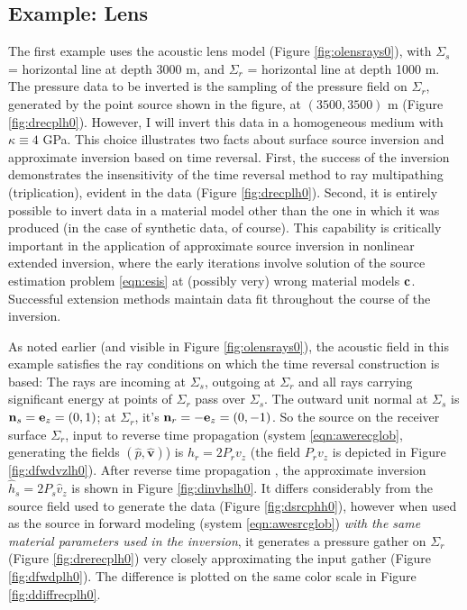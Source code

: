 \documentclass[12pt]{geophysics}
\newcommand{\bv}{\mathbf{v}}
\begin{document}
\subsection{Example: Lens}
The first example uses the acoustic lens model (Figure
\ref{fig:olensrays0}), with $\Sigma_s$ = horizontal line at depth 
3000 m, and $\Sigma_r$ = horizontal line at depth 1000 m. The pressure
data to be inverted is the sampling of the pressure field on
$\Sigma_r$, generated by the point source shown in the figure, at
$(3500, 3500)$ m (Figure \ref{fig:drecplh0}). However, I will invert
this data in a homogeneous medium with $\kappa \equiv 4$ GPa. This
choice illustrates two facts about surface source inversion and
approximate inversion based on time reversal. First, the success of the inversion demonstrates the
insensitivity of the time reversal method to ray multipathing
(triplication), evident in the data (Figure \ref{fig:drecplh0}).
Second, it is entirely possible to invert data in a material model
other than the one in which it was produced (in the case of synthetic
data, of course). This
capability is critically important in the application of 
approximate source inversion in nonlinear extended inversion, where the early iterations
involve solution of the source estimation problem \ref{eqn:esis} at
(possibly very) wrong material models ${\bf c}$. Successful extension
methods maintain data fit throughout the course of the inversion.

As noted earlier (and visible in Figure \ref{fig:olensrays0}), the acoustic field in this example satisfies the ray
conditions on which the time reversal construction is based: The rays
are incoming at $\Sigma_s$, outgoing at $\Sigma_r$ and all rays
carrying significant energy at points of $\Sigma_r$ pass over
$\Sigma_s$. The outward unit normal at $\Sigma_s$ is ${\bf n}_s ={\bf
  e}_z=(0,1)$; at $\Sigma_r$, it's ${\bf n}_r =-{\bf
  e}_z=(0,-1)$. So the source on the receiver surface $\Sigma_r$, input to reverse time propagation
(system \ref{eqn:awerecglob}, generating the fields $(\hat{p},\hat{\bv})$) is
$h_r=2P_rv_z$ (the field $P_rv_z$ is depicted in Figure \ref{fig:dfwdvzlh0}). After reverse time propagation , the approximate
inversion $\hat{h}_s=2P_s\hat{v}_z$ is shown in Figure
\ref{fig:dinvhslh0}. It differs considerably from the source field used to
generate the data (Figure \ref{fig:dsrcphh0}), however when used as the
source in forward modeling (system \ref{eqn:awesrcglob}) {\em with the
  same material parameters used in the inversion}, it generates a
pressure gather on $\Sigma_r$ (Figure \ref{fig:drerecplh0}) very
closely 
approximating the input gather (Figure \ref{fig:dfwdplh0}). The
difference is plotted on the same color scale in Figure
\ref{fig:ddiffrecplh0}.
\end{document}
